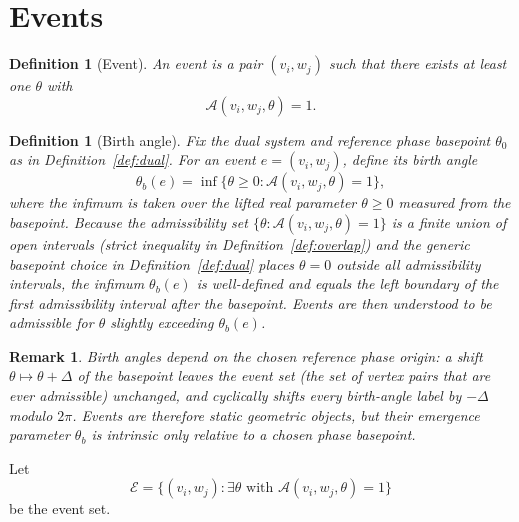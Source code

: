 \documentclass[12pt]{article}
\newtheorem{definition}[theorem]{Definition}
\newtheorem{remark}[theorem]{Remark}
\newcommand{\Ecal}{\mathcal{E}}
\newcommand{\Acal}{\mathcal{A}}
\begin{document}
\section{Events}\label{sec:events}

\begin{definition}[Event]\label{def:event}
An \emph{event} is a pair $(v_i, w_j)$ such that there exists at least one $\theta$ with
\[
\Acal(v_i, w_j, \theta) = 1.
\]
\end{definition}

\begin{definition}[Birth angle]\label{def:birth}
Fix the dual system and reference phase basepoint $\theta_0$ as in Definition~\ref{def:dual}. For an event $e = (v_i, w_j)$, define its \emph{birth angle}
\begin{equation}\label{eq:birth}
    \theta_b(e) = \inf\{\theta \geq 0 : \Acal(v_i, w_j, \theta) = 1\},
\end{equation}
where the infimum is taken over the lifted real parameter $\theta \geq 0$ measured from the basepoint. Because the admissibility set $\{\theta : \Acal(v_i, w_j, \theta) = 1\}$ is a finite union of open intervals (strict inequality in Definition~\ref{def:overlap}) and the generic basepoint choice in Definition~\ref{def:dual} places $\theta = 0$ outside all admissibility intervals, the infimum $\theta_b(e)$ is well-defined and equals the left boundary of the first admissibility interval after the basepoint. Events are then understood to be admissible for $\theta$ slightly exceeding $\theta_b(e)$.
\end{definition}

\begin{remark}
Birth angles depend on the chosen reference phase origin: a shift $\theta \mapsto \theta + \Delta$ of the basepoint leaves the event set (the set of vertex pairs that are ever admissible) unchanged, and cyclically shifts every birth-angle label by $-\Delta$ modulo $2\pi$. Events are therefore static geometric objects, but their emergence parameter $\theta_b$ is intrinsic only relative to a chosen phase basepoint.
\end{remark}


Let
\[
\Ecal = \{ (v_i, w_j) : \exists \theta \text{ with } \Acal(v_i, w_j, \theta)=1 \}
\]
be the event set.

\end{document}
